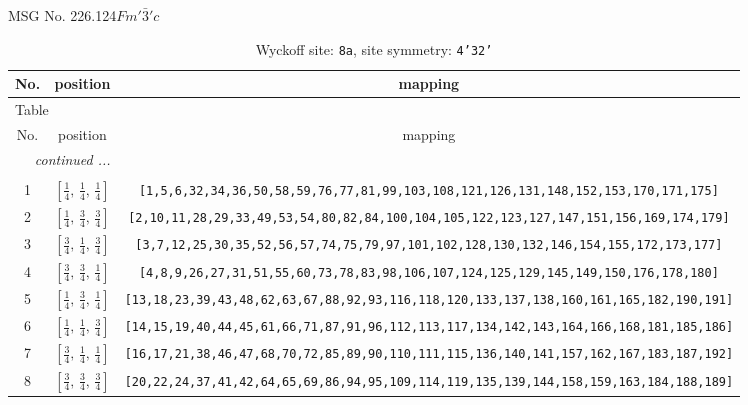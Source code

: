 \documentclass[fleqn,8pt]{jsarticle}
\begin{document}
\setcounter{MaxMatrixCols}{32}

\renewcommand{\tablename}{Table~}
\renewcommand{\figurename}{Figure~}
\begin{center}
\LARGE
MSG No. 226.124\quad$Fm'\bar{3}'c$
\end{center}
\renewcommand{\arraystretch}{1.2}
\begin{longtable}{ccc}
\caption{Wyckoff site: {\tt 8a}, site symmetry: {\tt 4'32'}}
 \\
 \hline \hline
No. & position & mapping \\ \hline \endfirsthead

\multicolumn{2}{l}{\tablename\ \thetable{}} \\
 \hline \hline
No. & position & mapping \\ \hline \endhead

 \hline \hline
\multicolumn{2}{r}{\footnotesize\it continued ...} \\ \endfoot

 \hline \hline
\multicolumn{2}{r}{} \\ \endlastfoot

1 & $\left[ \frac{1}{4},\, \frac{1}{4},\, \frac{1}{4} \right]$ & {\tt [1,5,6,32,34,36,50,58,59,76,77,81,99,103,108,121,126,131,148,152,153,170,171,175]} \\ \hline
2 & $\left[ \frac{1}{4},\, \frac{3}{4},\, \frac{3}{4} \right]$ & {\tt [2,10,11,28,29,33,49,53,54,80,82,84,100,104,105,122,123,127,147,151,156,169,174,179]} \\ \hline
3 & $\left[ \frac{3}{4},\, \frac{1}{4},\, \frac{3}{4} \right]$ & {\tt [3,7,12,25,30,35,52,56,57,74,75,79,97,101,102,128,130,132,146,154,155,172,173,177]} \\ \hline
4 & $\left[ \frac{3}{4},\, \frac{3}{4},\, \frac{1}{4} \right]$ & {\tt [4,8,9,26,27,31,51,55,60,73,78,83,98,106,107,124,125,129,145,149,150,176,178,180]} \\ \hline
5 & $\left[ \frac{1}{4},\, \frac{3}{4},\, \frac{1}{4} \right]$ & {\tt [13,18,23,39,43,48,62,63,67,88,92,93,116,118,120,133,137,138,160,161,165,182,190,191]} \\ \hline
6 & $\left[ \frac{1}{4},\, \frac{1}{4},\, \frac{3}{4} \right]$ & {\tt [14,15,19,40,44,45,61,66,71,87,91,96,112,113,117,134,142,143,164,166,168,181,185,186]} \\ \hline
7 & $\left[ \frac{3}{4},\, \frac{1}{4},\, \frac{1}{4} \right]$ & {\tt [16,17,21,38,46,47,68,70,72,85,89,90,110,111,115,136,140,141,157,162,167,183,187,192]} \\ \hline
8 & $\left[ \frac{3}{4},\, \frac{3}{4},\, \frac{3}{4} \right]$ & {\tt [20,22,24,37,41,42,64,65,69,86,94,95,109,114,119,135,139,144,158,159,163,184,188,189]} \\
\end{longtable}
\end{document}

